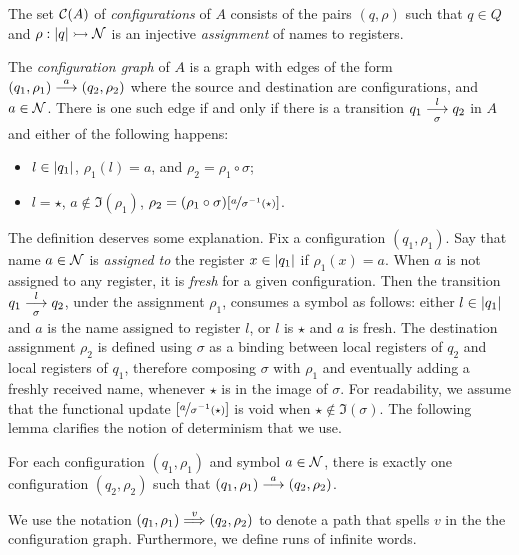 \begin{definition}\label{def:configuration-graph}
 The set $\mathcal{C}(A)$ of \emph{configurations} of $A$ consists of the pairs $(q,\rho)$ such that $q \in Q$ and $\rho : |q| \rightarrowtail \mathcal{N}$ is an injective \emph{assignment} of names to registers.
\end{definition}

\begin{definition}
\label{def:configuration-graph}
The \emph{configuration graph} of $A$ is a graph with edges of the form  
$(q_1,\rho_1) \overset{a}{\longrightarrow} (q_2,\rho_2)$ where the source and destination are configurations, and $a \in \mathcal{N}$. There is one such edge if and only if there is a transition $q_1 \overset{l}{\underset{\sigma}{\longrightarrow}} q_2$ in $A$ and either of the following happens: 
 \begin{itemize} 
  \item $l \in |q_1|$, $\rho_1(l) = a$, and $\rho_2 = \rho_1 \circ \sigma$;
  \item $l = \star$, $a \notin \Im(\rho_1)$, $\rho_2 = (\rho_1 \circ \sigma)[\nicefrac{a}{\sigma^{-1}(\star)}]$.
 \end{itemize}
\end{definition}
% 

The definition deserves some explanation. Fix a configuration $(q_1,\rho_1)$. Say that name $a\in \mathcal{N}$ is \emph{assigned to} the register $x \in |q_1|$ if $\rho_1(x) = a$. When $a$ is not assigned to any register, it is \emph{fresh} for a given configuration. Then the transition $q_1 \overset{l}{\underset{\sigma}{\longrightarrow}} q_2$, under the assignment $\rho_1$, consumes a symbol as follows: either $l \in |q_1|$ and $a$ is the name assigned to register $l$, or $l$ is $\star$ and $a$ is fresh. The destination assignment $\rho_2$ is defined using $\sigma$ as a binding between local registers of $q_2$ and local registers of $q_1$, therefore composing $\sigma$ with $\rho_1$ and eventually adding a freshly received name, whenever $\star$ is in the image of $\sigma$. For readability, we assume that the functional update $[\nicefrac{a}{\sigma^{-1}(\star)}]$ is void when $\star \notin \Im(\sigma)$. The following lemma clarifies the notion of determinism that we use.

\begin{lemma}
\label{lem:deterministic-configuration-graph}
 For each configuration $(q_1,\rho_1)$ and symbol $a \in \mathcal{N}$, there is exactly one configuration $(q_2,\rho_2)$ such that $(q_1,\rho_1) \overset{a}{\longrightarrow} (q_2,\rho_2)$.
\end{lemma}
%
We use the notation $(q_1,\rho_1) \overset{v}{\Longrightarrow} (q_2,\rho_2)$ to denote a path that spells $v$ in the the configuration graph. Furthermore, we define runs of infinite words.
%

